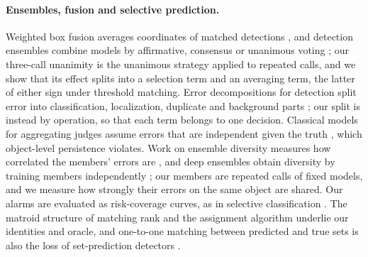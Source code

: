 \paragraph{Ensembles, fusion and selective prediction.} Weighted box fusion averages coordinates of matched detections \citep{solovyev2021wbf}, and detection ensembles combine models by affirmative, consensus or unanimous voting \citep{casadogarcia2020ensemble}; our three-call unanimity is the unanimous strategy applied to repeated calls, and we show that its effect splits into a selection term and an averaging term, the latter of either sign under threshold matching. Error decompositions for detection split error into classification, localization, duplicate and background parts \citep{bolya2020tide,oksuz2018lrp}; our split is instead by operation, so that each term belongs to one decision. Classical models for aggregating judges assume errors that are independent given the truth \citep{dawid1979maximum,grofman1983thirteen}, which object-level persistence violates. Work on ensemble diversity measures how correlated the members' errors are \citep{kuncheva2003diversity}, and deep ensembles obtain diversity by training members independently \citep{lakshminarayanan2017ensembles}; our members are repeated calls of fixed models, and we measure how strongly their errors on the same object are shared. Our alarms are evaluated as risk-coverage curves, as in selective classification \citep{geifman2017selective}. The matroid structure of matching rank \citep{edmonds1965transversals} and the assignment algorithm \citep{kuhn1955hungarian} underlie our identities and oracle, and one-to-one matching between predicted and true sets is also the loss of set-prediction detectors \citep{carion2020detr}.

